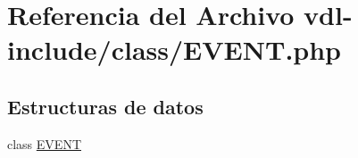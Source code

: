 \hypertarget{EVENT_8php}{\section{Referencia del Archivo vdl-\/include/class/\-E\-V\-E\-N\-T.php}
\label{EVENT_8php}
}
\subsection*{Estructuras de datos}
\begin{DoxyCompactItemize}
\item 
class \hyperlink{classEVENT}{E\-V\-E\-N\-T}
\end{DoxyCompactItemize}

